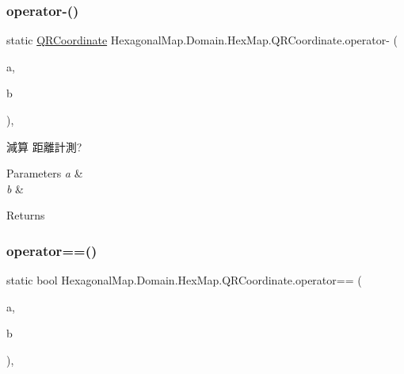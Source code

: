 \subsubsection{\texorpdfstring{operator-\/()}{operator-()}}
{\footnotesize\ttfamily static \mbox{\hyperlink{struct_hexagonal_map_1_1_domain_1_1_hex_map_1_1_q_r_coordinate}{Q\+R\+Coordinate}} Hexagonal\+Map.\+Domain.\+Hex\+Map.\+Q\+R\+Coordinate.\+operator-\/ (\begin{DoxyParamCaption}\item[{\mbox{\hyperlink{struct_hexagonal_map_1_1_domain_1_1_hex_map_1_1_q_r_coordinate}{Q\+R\+Coordinate}}}]{a,  }\item[{\mbox{\hyperlink{struct_hexagonal_map_1_1_domain_1_1_hex_map_1_1_q_r_coordinate}{Q\+R\+Coordinate}}}]{b }\end{DoxyParamCaption})\hspace{0.3cm}{\ttfamily [inline]}, {\ttfamily [static]}}



減算 距離計測? 


\begin{DoxyParams}{Parameters}
{\em a} & \\
\hline
{\em b} & \\
\hline
\end{DoxyParams}
\begin{DoxyReturn}{Returns}

\end{DoxyReturn}
\mbox{\label{struct_hexagonal_map_1_1_domain_1_1_hex_map_1_1_q_r_coordinate_a599140a6d544578de04111e2acca247d}} 
\subsubsection{\texorpdfstring{operator==()}{operator==()}}
{\footnotesize\ttfamily static bool Hexagonal\+Map.\+Domain.\+Hex\+Map.\+Q\+R\+Coordinate.\+operator== (\begin{DoxyParamCaption}\item[{\mbox{\hyperlink{struct_hexagonal_map_1_1_domain_1_1_hex_map_1_1_q_r_coordinate}{Q\+R\+Coordinate}}}]{a,  }\item[{\mbox{\hyperlink{struct_hexagonal_map_1_1_domain_1_1_hex_map_1_1_q_r_coordinate}{Q\+R\+Coordinate}}}]{b }\end{DoxyParamCaption})\hspace{0.3cm}{\ttfamily [inline]}, {\ttfamily [static]}}



